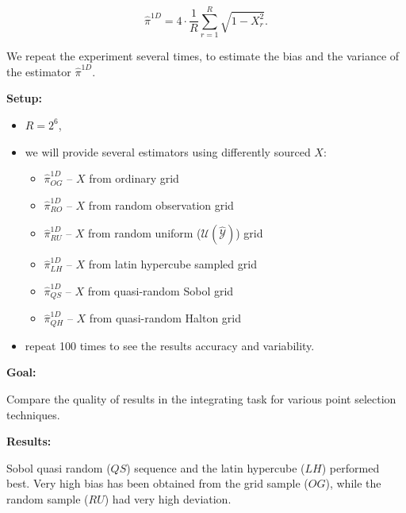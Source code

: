 \documentclass[shortabstract]{iithesis}
\begin{document}
\begin{equation*}
    \hat{\pi}^{1D} =  4 \cdot \frac 1 R \sum_{r=1}^R \sqrt{1 - X_r^2}\text{.}
\end{equation*}

We repeat the experiment several times, to estimate the bias and the variance of the estimator $ \hat{\pi}^{1D}$. 

\textbf{Setup:}
\begin{itemize}
    \item $R=2^6$,
    \item we  will provide several estimators using differently sourced $X$:
    \begin{itemize}
        \item $\hat{\pi}^{1D}_{OG}$ -- $X$ from ordinary grid 
        \item $\hat{\pi}^{1D}_{RO}$ -- $X$ from random observation grid 
        \item $\hat{\pi}^{1D}_{RU}$ -- $X$ from random uniform ($\mathcal U (\hat{\mathcal Y})$) grid 
        \item $\hat{\pi}^{1D}_{LH}$ -- $X$ from latin hypercube sampled grid 
        \item $\hat{\pi}^{1D}_{QS}$ -- $X$ from quasi-random Sobol grid 
        \item $\hat{\pi}^{1D}_{QH}$ -- $X$ from quasi-random Halton grid 
    \end{itemize}
    \item repeat 100 times to see the results accuracy and variability.
\end{itemize}

\textbf{Goal:}

Compare the quality of results in the integrating task for various point selection techniques. 

\textbf{Results:}

Sobol quasi random ($QS$) sequence and the latin hypercube ($LH$) performed best.  Very high bias has been obtained from the grid sample ($OG$), while the random sample ($RU$) had  very high deviation. 
\end{document}

